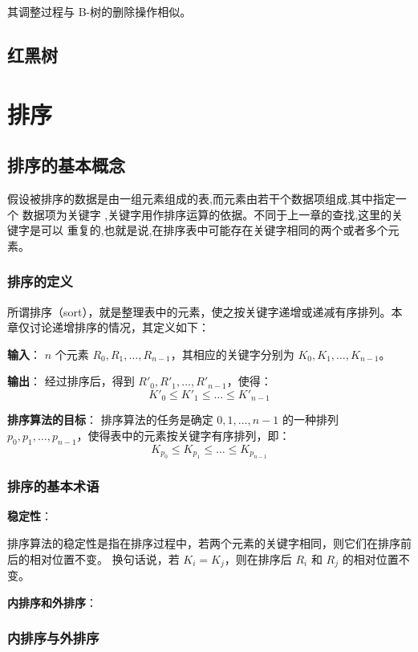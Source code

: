 \documentclass[lang=cn,newtx,10pt,scheme=chinese]{../elegantbook}
\begin{document}
      其调整过程与 B-树的删除操作相似。
\section{红黑树}


\chapter{排序}

\section{排序的基本概念}
假设被排序的数据是由一组元素组成的表,而元素由若干个数据项组成,其中指定一个
数据项为关键字 ,关键字用作排序运算的依据。不同于上一章的查找,这里的关键字是可以
重复的,也就是说,在排序表中可能存在关键字相同的两个或者多个元素。

 

\subsection{排序的定义}

所谓排序（sort），就是整理表中的元素，使之按关键字递增或递减有序排列。本章仅讨论递增排序的情况，其定义如下：


\textbf{输入}：  
$n$ 个元素 $R_0, R_1, \dots, R_{n-1}$，其相应的关键字分别为 $K_0, K_1, \dots, K_{n-1}$。


\textbf{输出}：  
经过排序后，得到 $R'_0, R'_1, \dots, R'_{n-1}$，使得：
\[
K'_0 \leq K'_1 \leq \dots \leq K'_{n-1}
\]


\textbf{排序算法的目标}：  
排序算法的任务是确定 $0, 1, \dots, n-1$ 的一种排列 $p_0, p_1, \dots, p_{n-1}$，使得表中的元素按关键字有序排列，即：
\[
K_{p_0} \leq K_{p_1} \leq \dots \leq K_{p_{n-1}}
\]

\subsection{排序的基本术语}

\textbf{稳定性}：

排序算法的稳定性是指在排序过程中，若两个元素的关键字相同，则它们在排序前后的相对位置不变。
换句话说，若 $K_i = K_j$，则在排序后 $R_i$ 和 $R_j$ 的相对位置不变。

\textbf{内排序和外排序}：
\subsection{内排序与外排序}
\end{document}
